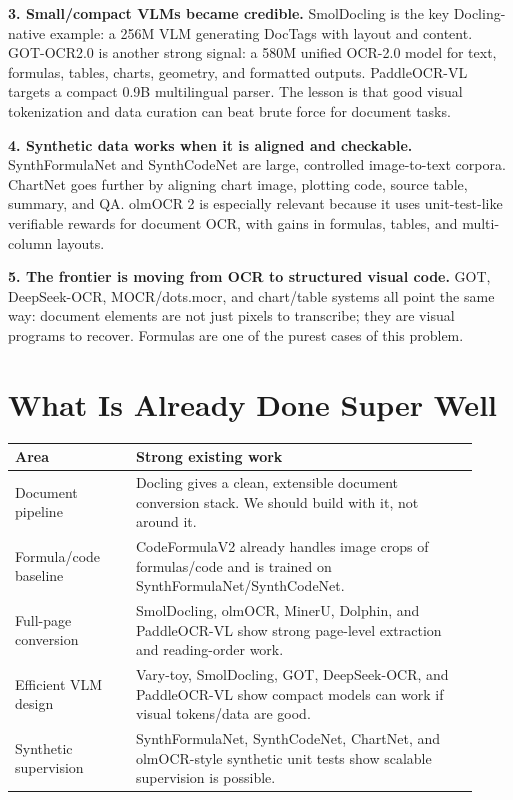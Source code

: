 \documentclass[10pt]{article}
\begin{document}
\textbf{3. Small/compact VLMs became credible.} SmolDocling is the key Docling-native example: a 256M VLM generating DocTags with layout and content. GOT-OCR2.0 is another strong signal: a 580M unified OCR-2.0 model for text, formulas, tables, charts, geometry, and formatted outputs. PaddleOCR-VL targets a compact 0.9B multilingual parser. The lesson is that good visual tokenization and data curation can beat brute force for document tasks.

\textbf{4. Synthetic data works when it is aligned and checkable.} SynthFormulaNet and SynthCodeNet are large, controlled image-to-text corpora. ChartNet goes further by aligning chart image, plotting code, source table, summary, and QA. olmOCR 2 is especially relevant because it uses unit-test-like verifiable rewards for document OCR, with gains in formulas, tables, and multi-column layouts.

\textbf{5. The frontier is moving from OCR to structured visual code.} GOT, DeepSeek-OCR, MOCR/dots.mocr, and chart/table systems all point the same way: document elements are not just pixels to transcribe; they are visual programs to recover. Formulas are one of the purest cases of this problem.

\section{What Is Already Done Super Well}

\begin{tabular}{p{0.24\linewidth}p{0.68\linewidth}}
\toprule
\textbf{Area} & \textbf{Strong existing work} \\
\midrule
Document pipeline & Docling gives a clean, extensible document conversion stack. We should build with it, not around it. \\
Formula/code baseline & CodeFormulaV2 already handles image crops of formulas/code and is trained on SynthFormulaNet/SynthCodeNet. \\
Full-page conversion & SmolDocling, olmOCR, MinerU, Dolphin, and PaddleOCR-VL show strong page-level extraction and reading-order work. \\
Efficient VLM design & Vary-toy, SmolDocling, GOT, DeepSeek-OCR, and PaddleOCR-VL show compact models can work if visual tokens/data are good. \\
Synthetic supervision & SynthFormulaNet, SynthCodeNet, ChartNet, and olmOCR-style synthetic unit tests show scalable supervision is possible. \\
\bottomrule
\end{tabular}
\end{document}
